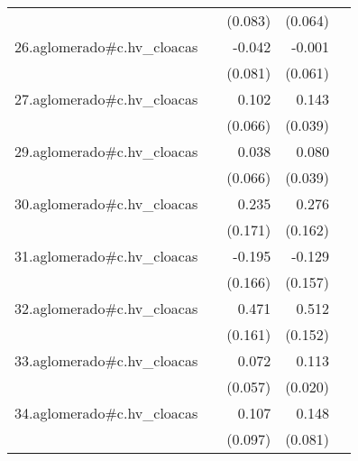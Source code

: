 {\begin{longtable}{l*{4}{D{.}{.}{-1}}}
            &                     &     (0.083)         &     (0.064)         &                     \\
\addlinespace
26.aglomerado#c.hv\_cloacas&                     &      -0.042         &      -0.001         &                     \\
            &                     &     (0.081)         &     (0.061)         &                     \\
\addlinespace
27.aglomerado#c.hv\_cloacas&                     &       0.102         &       0.143\sym{***}&                     \\
            &                     &     (0.066)         &     (0.039)         &                     \\
\addlinespace
29.aglomerado#c.hv\_cloacas&                     &       0.038         &       0.080\sym{*}  &                     \\
            &                     &     (0.066)         &     (0.039)         &                     \\
\addlinespace
30.aglomerado#c.hv\_cloacas&                     &       0.235         &       0.276         &                     \\
            &                     &     (0.171)         &     (0.162)         &                     \\
\addlinespace
31.aglomerado#c.hv\_cloacas&                     &      -0.195         &      -0.129         &                     \\
            &                     &     (0.166)         &     (0.157)         &                     \\
\addlinespace
32.aglomerado#c.hv\_cloacas&                     &       0.471\sym{**} &       0.512\sym{***}&                     \\
            &                     &     (0.161)         &     (0.152)         &                     \\
\addlinespace
33.aglomerado#c.hv\_cloacas&                     &       0.072         &       0.113\sym{***}&                     \\
            &                     &     (0.057)         &     (0.020)         &                     \\
\addlinespace
34.aglomerado#c.hv\_cloacas&                     &       0.107         &       0.148         &                     \\
            &                     &     (0.097)         &     (0.081)         &                     \\

\end{longtable}}
